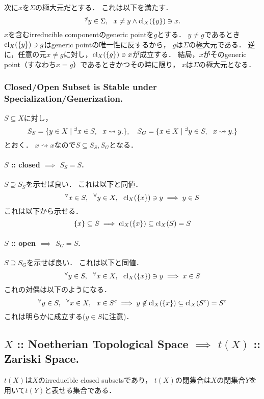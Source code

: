\documentclass[a4paper]{jsarticle}
\begin{document}
    次に$x$を$\Sigma$の極大元だとする．
    これは以下を満たす．
    \[ {}^{\not \exists} y \in \Sigma,~~ x \neq y \land \operatorname{cl}_X(\{y\}) \ni x. \]
    $x$を含むirreducible componentのgeneric pointを$g$とする．
    $y \neq g$であるとき$\operatorname{cl}_X(\{y\}) \ni g$はgeneric pointの唯一性に反するから，
    $g$は$\Sigma$の極大元である．
    逆に，任意の元$x \neq g$に対し，$\operatorname{cl}_X(\{g\}) \ni x$が成立する．
    結局，$x$がそのgeneric point（すなわち$x=g$）であるときかつその時に限り，
    $x$は$\Sigma$の極大元となる．

    \subsubsection{Closed/Open Subset is Stable under Specialization/Generization.}
    $S \subseteq X$に対し，
    \[
        S_S=\{ y \in X \mid {}^{\exists} x \in S,~~ x \rightsquigarrow y. \},~~~
        S_G=\{ x \in X \mid {}^{\exists} y \in S,~~ x \rightsquigarrow y. \}
    \]
    とおく．
    $x \rightsquigarrow x$なので$S \subseteq S_S, S_G$となる．
    
    \paragraph{$S$ :: closed $\implies$ $S_S=S$.}
    $S \supseteq S_S$を示せば良い．
    これは以下と同値．
    \[
        {}^{\forall} x \in S,~~ {}^{\forall} y \in X,~~ 
        \operatorname{cl}_X(\{x\}) \ni y \implies y \in S
    \]
    これは以下から示せる．
    \[ \{x\} \subseteq S \implies \operatorname{cl}_X(\{x\}) \subseteq \operatorname{cl}_X(S)=S \]

    \paragraph{$S$ :: open $\implies$ $S_G=S$.}
    $S \supseteq S_G$を示せば良い．
    これは以下と同値．
    \[
        {}^{\forall} y \in S,~~ {}^{\forall} x \in X,~~ 
        \operatorname{cl}_X(\{x\}) \ni y \implies x \in S
    \]
    これの対偶は以下のようになる．
    \[
        {}^{\forall} y \in S,~~ {}^{\forall} x \in X,~~ 
        x \in S^c \implies y \not \in \operatorname{cl}_X(\{x\}) \subseteq \operatorname{cl}_X(S^c)=S^c
    \]
    これは明らかに成立する($y \in S$に注意)．

    \subsection{$X$ :: Noetherian Topological Space $\implies$ $t(X)$ :: Zariski Space.}
    $t(X)$は$X$のirreducible closed subsetsであり，
    $t(X)$の閉集合は$X$の閉集合$Y$を用いて$t(Y)$と表せる集合である．
\end{document}
